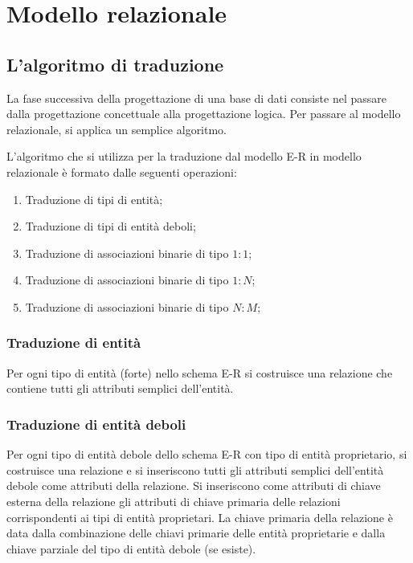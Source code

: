 
\chapter{Modello relazionale}
\label{cap:modello-relazionale}

\section{L'algoritmo di traduzione}
La fase successiva della progettazione di una base di dati consiste nel passare dalla progettazione concettuale alla progettazione logica. Per passare al modello relazionale, si applica un semplice algoritmo.

L'algoritmo che si utilizza per la traduzione dal modello E-R in modello relazionale è formato dalle seguenti operazioni:

\begin{enumerate}
	
	\item
	Traduzione di tipi di entità;
	
	\item
	Traduzione di tipi di entità deboli;
	
	\item
	Traduzione di associazioni binarie di tipo $1:1$;
	
	\item
	Traduzione di associazioni binarie di tipo $1:N$;
	
	\item
	Traduzione di associazioni binarie di tipo $N:M$;

\end{enumerate}

\subsection{Traduzione di entità}
	Per ogni tipo di entità (forte) nello schema E-R si costruisce una relazione che contiene tutti gli attributi semplici dell'entità.

\subsection{Traduzione di entità deboli}
	Per ogni tipo di entità debole dello schema E-R con tipo di entità proprietario, si costruisce una relazione e si inseriscono tutti gli attributi semplici dell'entità debole come attributi della relazione. Si inseriscono come attributi di chiave esterna della relazione gli attributi di chiave primaria delle relazioni corrispondenti ai tipi di entità proprietari. La chiave primaria della relazione è data dalla combinazione delle chiavi primarie delle entità proprietarie e dalla chiave parziale del tipo di entità debole (se esiste).

